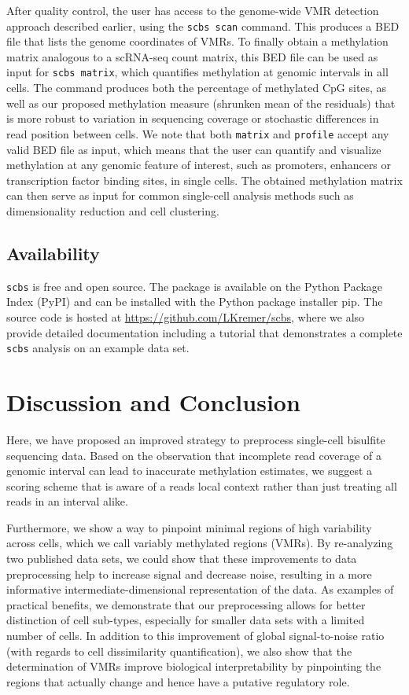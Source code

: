 \documentclass[twocolumn,10pt]{article}
\begin{document}
After quality control, the user has access to the genome-wide VMR detection approach described earlier, using the \texttt{scbs scan} command. This produces a BED file that lists the genome coordinates of VMRs. To finally obtain a methylation matrix analogous to a scRNA-seq count matrix, this BED file can be used as input for \texttt{scbs matrix}, which quantifies methylation at genomic intervals in all cells. The command produces both the percentage of methylated CpG sites, as well as our proposed methylation measure (shrunken mean of the residuals) that is more robust to variation in sequencing coverage or stochastic differences in read position between cells. We note that both \texttt{matrix} and \texttt{profile} accept any valid BED file as input, which means that the user can quantify and visualize methylation at any genomic feature of interest, such as promoters, enhancers or transcription factor binding sites, in single cells. The obtained methylation matrix can then serve as input for common single-cell analysis methods such as dimensionality reduction and cell clustering.

\subsection{Availability}

\texttt{scbs} is free and open source.
The package is available on the Python Package Index (PyPI) and can be installed with the Python package installer pip.
The source code is hosted at \href{https://github.com/LKremer/scbs}{https://github.com/LKremer/scbs}, where we also provide detailed documentation including a tutorial that demonstrates a complete \texttt{scbs} analysis on an example data set.




\section{Discussion and Conclusion}

Here, we have proposed an improved strategy to preprocess single-cell bisulfite sequencing data.
Based on the observation that incomplete read coverage of a genomic interval can lead to inaccurate methylation estimates, we suggest a scoring scheme that is aware of a reads local context rather than just treating all reads in an interval alike.

Furthermore, we show a way to pinpoint minimal regions of high variability across cells, which we call variably methylated regions (VMRs).
By re-analyzing two published data sets, we could show that these improvements to data preprocessing help to increase signal and decrease noise, resulting in a more informative intermediate-dimensional representation of the data. As examples of practical benefits, we demonstrate that our preprocessing allows for better distinction of cell sub-types, especially for smaller data sets with a limited number of cells. In addition to this improvement of global signal-to-noise ratio (with regards to cell dissimilarity quantification), we also show that the determination of VMRs improve biological interpretability by pinpointing the regions that actually change and hence have a putative regulatory role.
\end{document}
